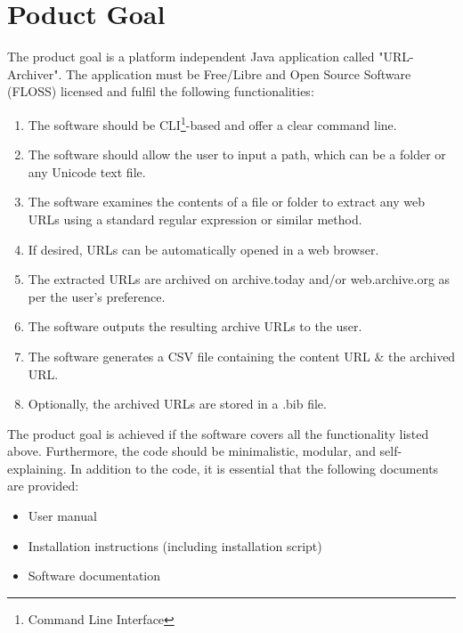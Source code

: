 \section{Poduct Goal}
The product goal is a platform independent Java application called "URL-Archiver".
The application must be Free/Libre and Open Source Software (FLOSS) licensed and fulfil the following functionalities:
\begin{enumerate}
    \item The software should be CLI\footnote{Command Line Interface}-based and offer a clear command line.
    \item The software should allow the user to input a path, which can be a folder or any Unicode text file.
    \item The software examines the contents of a file or folder to extract any web URLs using a standard regular expression or similar method.
    \item If desired, URLs can be automatically opened in a web browser.
    \item The extracted URLs are archived on archive.today and/or web.archive.org as per the user's preference.
    \item The software outputs the resulting archive URLs to the user.
    \item The software generates a CSV file containing the content URL \& the archived URL.
    \item Optionally, the archived URLs are stored in a .bib file.
\end{enumerate}
The product goal is achieved if the software covers all the functionality listed above.
Furthermore, the code should be minimalistic, modular, and self-explaining.
In addition to the code, it is essential that the following documents are provided:
\begin{itemize}
    \item User manual
    \item Installation instructions (including installation script)
    \item Software documentation
\end{itemize}

\cite{titleimage}
\cite{knuthwebsite}
\cite{einstein}


